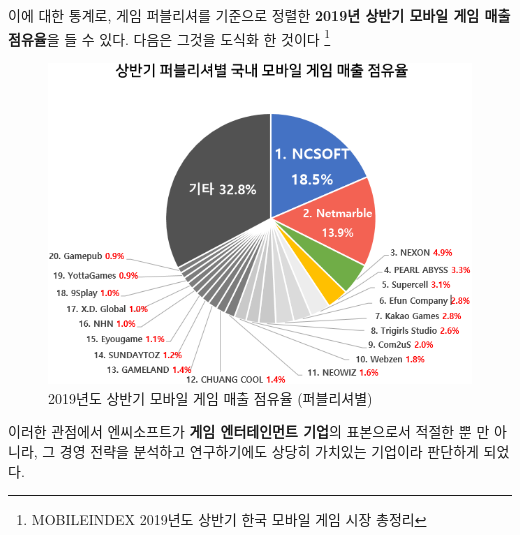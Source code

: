 \documentclass[11pt]{oblivoir}
\begin{document}
			이에 대한 통계로, 게임 퍼블리셔를 기준으로 정렬한 \textbf{2019년 상반기 모바일 게임 매출 점유율}을 들 수 있다. 다음은 그것을 도식화 한 것이다
			\footnote{MOBILEINDEX 2019년도 상반기 한국 모바일 게임 시장 총정리}
			
			\begin{figure}[htbp]
				\centering
				\includegraphics[width=1\textwidth]{MobileMaechul.png}
				\caption{2019년도 상반기 모바일 게임 매출 점유율 (퍼블리셔별)}
			\end{figure}
			
			이러한 관점에서 엔씨소프트가 \textbf{게임 엔터테인먼트 기업}의 표본으로서 적절한 뿐 만 아니라, 그 경영 전략을 분석하고 연구하기에도 상당히 가치있는 기업이라 판단하게 되었다. 
			
\end{document}
